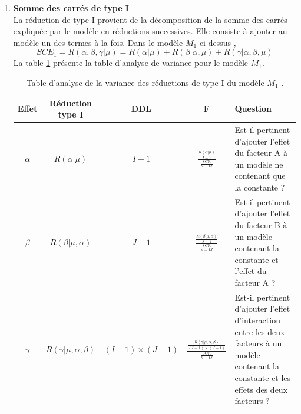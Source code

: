 \documentclass[12pt,a4paper]{article}
\begin{document}
	\begin{enumerate}[label=\textbf{\alph*})]
		\item \textbf{Somme des carrés de type I}\\
		La réduction de type I provient de la décomposition de la somme des carrés expliquée par le modèle en réductions successives. Elle consiste à ajouter au modèle un des termes à la fois. Dans le modèle $M_1$ ci-dessus \cite{navarro2021},
		\begin{equation}
			SCE_1 = R(\alpha,\beta,\gamma|\mu) = R(\alpha|\mu) + R(\beta|\alpha,\mu) + R(\gamma|\alpha,\beta,\mu)
		\end{equation}
		La table \ref{ref:analyse_var_1} présente la table d'analyse de variance pour le modèle $M_1$.
		\begin{table}[H]
			\centering
			\caption{Table d'analyse de la variance des réductions de type I du modèle $M_1$ \cite{daudin}.}
			\begin{tabular}{|c|c|c|c|p{6cm}|}
				\hline
				\textbf{Effet} & \textbf{Réduction type I} & \textbf{DDL} & \textbf{F} & \textbf{Question} \\
				\hline
				$\alpha$ & $R(\alpha|\mu)$ & $I-1$ & \LARGE{$\frac{\frac{R(\alpha|\mu)}{I-1}}{\frac{\text{SCR}}{n-IJ}}$} & Est-il pertinent d'ajouter l'effet du facteur A à un modèle ne contenant que la constante ? \\
				\hline
				$\beta$ & $R(\beta|\mu, \alpha)$ & $J-1$ & \LARGE{$\frac{\frac{R(\beta|\mu, \alpha)}{J-1}}{\frac{\text{SCR}}{n-IJ}}$} & Est-il pertinent d'ajouter l'effet du facteur B à un modèle contenant la constante et l'effet du facteur A ? \\
				\hline
				$\gamma$ & $R(\gamma|\mu, \alpha, \beta)$ & $(I-1) \times (J-1)$ & \LARGE{$\frac{\frac{R(\gamma|\mu, \alpha, \beta)}{(I-1) \times (J-1)}}{\frac{\text{SCR}}{n-IJ}}$} & Est-il pertinent d'ajouter l'effet d'interaction entre les deux facteurs à un modèle contenant la constante et les effets des deux facteurs ? \\
				\hline
			\end{tabular}
		\label{ref:analyse_var_1}
		\end{table}
		

\end{enumerate}
\end{document}

